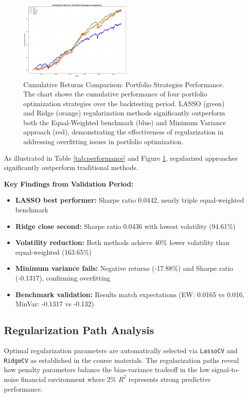 \documentclass[12pt]{article}
\begin{document}
\begin{figure}[H]
\centering
\includegraphics[width=0.5\textwidth]{figure1.png}
\caption{Cumulative Returns Comparison: Portfolio Strategies Performance. The chart shows the cumulative performance of four portfolio optimization strategies over the backtesting period. LASSO (green) and Ridge (orange) regularization methods significantly outperform both the Equal-Weighted benchmark (blue) and Minimum Variance approach (red), demonstrating the effectiveness of regularization in addressing overfitting issues in portfolio optimization.}
\label{fig:cumulative_returns}
\end{figure}

As illustrated in Table \ref{tab:performance} and Figure \ref{fig:cumulative_returns}, regularized approaches significantly outperform traditional methods.

\textbf{Key Findings from Validation Period:}
\begin{itemize}
    \item \textbf{LASSO best performer:} Sharpe ratio 0.0442, nearly triple equal-weighted benchmark
    \item \textbf{Ridge close second:} Sharpe ratio 0.0436 with lowest volatility (94.61\%)
    \item \textbf{Volatility reduction:} Both methods achieve 40\% lower volatility than equal-weighted (163.65\%)
    \item \textbf{Minimum variance fails:} Negative returns (-17.88\%) and Sharpe ratio (-0.1317), confirming overfitting
    \item \textbf{Benchmark validation:} Results match expectations (EW: 0.0165 vs 0.016, MinVar: -0.1317 vs -0.132)
\end{itemize}

\subsection{Regularization Path Analysis}
Optimal regularization parameters are automatically selected via \texttt{LassoCV} and \texttt{RidgeCV} as established in the course materials. The regularization paths reveal how penalty parameters balance the bias-variance tradeoff in the low signal-to-noise financial environment where 2\% $R^2$ represents strong predictive performance.
\end{document}
